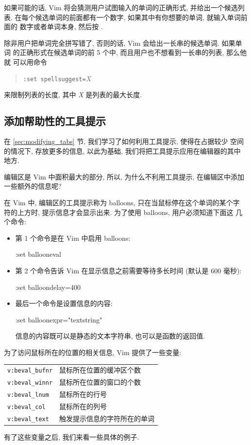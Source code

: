 \begin{warning}
如果可能的话, Vim 将会猜测用户试图输入的单词的正确形式, 并给出一个候选列表.
在每个候选单词的前面都有一个数字, 如果其中有你想要的单词, 就输入单词前面的
数字或者单词本身, 然后按 .

除非用户把单词完全拼写错了, 否则的话, Vim 会给出一长串的候选单词. 如果单词 
的正确形式在候选单词的前 5 个中, 而且用户也不想看到一长串的列表, 那么他就
可以用命令
\begin{quotation}
    \texttt{:set spellsuggest=}\textit{X}
\end{quotation}
来限制列表的长度, 其中 \textit{X} 是列表的最大长度.

\subsection{添加帮助性的工具提示}
\label{subsec:adding_helpful_tool_tips}

在 \ref{sec:modifying_tabs} 节, 我们学习了如何利用工具提示, 使得在占据较少
空间的情况下, 存放更多的信息, 以此为基础, 我们将把工具提示应用在编辑器的其中
地方.

编辑区是 Vim 中面积最大的部分, 所以, 为什么不利用工具提示, 在编辑区中添加
一些额外的信息呢?

在 Vim 中, 编辑区的工具提示称为 balloons, 只在当鼠标停在这个单词的某个字
符的上方时, 提示信息才会显示出来. 为了使用 balloons, 用户必须知道下面这
几个命令:
\begin{itemize}
    \item 第 1 个命令是在 Vim 中启用 balloons:
    \begin{vimcmd}
    :set ballooneval
    \end{vimcmd}
    \item 第 2 个命令告诉 Vim 在显示信息之前需要等待多长时间 (默认是 600
    毫秒):
    \begin{vimcmd}
    :set balloondelay=400
    \end{vimcmd}
    \item 最后一个命令是设置信息的内容:
    \begin{vimcmd}
    :set balloonexpr="textstring"
    \end{vimcmd}
    信息的内容既可以是静态的文本字符串, 也可以是函数的返回值.
\end{itemize}

为了访问鼠标所在的位置的相关信息, Vim 提供了一些变量:
\begin{center}
\begin{tabular}{ll}
    \hline
    \texttt{v:beval\_bufnr} & 鼠标所在位置的缓冲区个数 \\
    \texttt{v:beval\_winnr} & 鼠标所在位置的窗口的个数 \\
    \texttt{v:beval\_lnum}  & 鼠标所在的行号 \\
    \texttt{v:beval\_col}   & 鼠标所在的列号 \\
    \texttt{v:beval\_text}  & 触发提示信息的字符所在的单词 \\
    \hline
\end{tabular}
\end{center}
有了这些变量之后, 我们来看一些具体的例子.


\end{warning}
